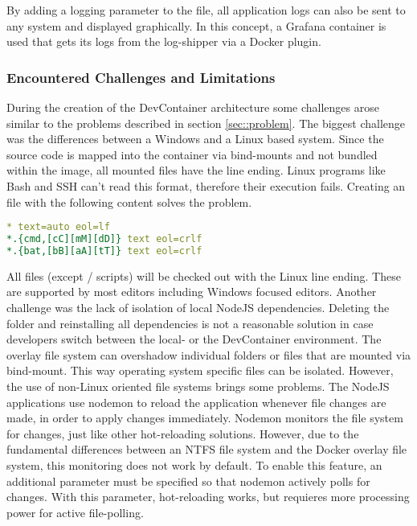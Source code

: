        By adding a logging parameter to the  file, all application logs can also be sent to any system and displayed graphically. In this concept, a Grafana container is used that gets its logs from the  log-shipper via a Docker plugin.\newline
        

        \subsubsection{Encountered Challenges and Limitations}
        During the creation of the DevContainer architecture some challenges arose similar to the problems described in section \ref{sec::problem}. The biggest challenge was the differences between a Windows and a Linux based system. Since the source code is mapped into the container via bind-mounts and not bundled within the image, all mounted files have the  line ending. Linux programs like Bash and \ac{SSH} can't read this format, therefore their execution fails. Creating an  file with the following content solves the problem.
        \begin{lstlisting}[language=yml,frame=none, numbers=none, backgroundcolor=\color{codebg}]
* text=auto eol=lf
*.{cmd,[cC][mM][dD]} text eol=crlf
*.{bat,[bB][aA][tT]} text eol=crlf
        \end{lstlisting}
        \vspace{-0.5cm}
        All files (except / scripts) will be checked out with the Linux  line ending. These are supported by most editors including Windows focused editors.\newline
        Another challenge was the lack of isolation of local NodeJS dependencies. Deleting the  folder and reinstalling all dependencies is not a reasonable solution in case developers switch between the local- or the DevContainer environment. The overlay file system can overshadow individual folders or files that are mounted via bind-mount. This way operating system specific files can be isolated. However, the use of non-Linux oriented file systems brings some problems. The NodeJS applications use nodemon to reload the application whenever file changes are made, in order to apply changes immediately. Nodemon monitors the file system for changes, just like other hot-reloading solutions. However, due to the fundamental differences between an NTFS file system and the Docker overlay file system, this monitoring does not work by default. To enable this feature, an additional parameter must be specified so that nodemon actively polls for changes. With this parameter, hot-reloading works, but requieres more processing power for active file-polling.\newline
